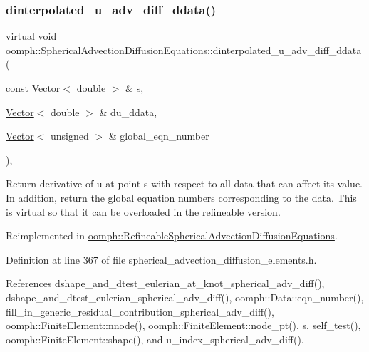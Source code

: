 \subsubsection{\texorpdfstring{dinterpolated\+\_\+u\+\_\+adv\+\_\+diff\+\_\+ddata()}{dinterpolated\_u\_adv\_diff\_ddata()}}
{\footnotesize\ttfamily virtual void oomph\+::\+Spherical\+Advection\+Diffusion\+Equations\+::dinterpolated\+\_\+u\+\_\+adv\+\_\+diff\+\_\+ddata (\begin{DoxyParamCaption}\item[{const \hyperlink{classoomph_1_1Vector}{Vector}$<$ double $>$ \&}]{s,  }\item[{\hyperlink{classoomph_1_1Vector}{Vector}$<$ double $>$ \&}]{du\+\_\+ddata,  }\item[{\hyperlink{classoomph_1_1Vector}{Vector}$<$ unsigned $>$ \&}]{global\+\_\+eqn\+\_\+number }\end{DoxyParamCaption})\hspace{0.3cm}{\ttfamily [inline]}, {\ttfamily [virtual]}}



Return derivative of u at point s with respect to all data that can affect its value. In addition, return the global equation numbers corresponding to the data. This is virtual so that it can be overloaded in the refineable version. 



Reimplemented in \hyperlink{classoomph_1_1RefineableSphericalAdvectionDiffusionEquations_ad334452c86e729a53dcbd234a1420680}{oomph\+::\+Refineable\+Spherical\+Advection\+Diffusion\+Equations}.



Definition at line 367 of file spherical\+\_\+advection\+\_\+diffusion\+\_\+elements.\+h.



References dshape\+\_\+and\+\_\+dtest\+\_\+eulerian\+\_\+at\+\_\+knot\+\_\+spherical\+\_\+adv\+\_\+diff(), dshape\+\_\+and\+\_\+dtest\+\_\+eulerian\+\_\+spherical\+\_\+adv\+\_\+diff(), oomph\+::\+Data\+::eqn\+\_\+number(), fill\+\_\+in\+\_\+generic\+\_\+residual\+\_\+contribution\+\_\+spherical\+\_\+adv\+\_\+diff(), oomph\+::\+Finite\+Element\+::nnode(), oomph\+::\+Finite\+Element\+::node\+\_\+pt(), s, self\+\_\+test(), oomph\+::\+Finite\+Element\+::shape(), and u\+\_\+index\+\_\+spherical\+\_\+adv\+\_\+diff().

\mbox{\label{classoomph_1_1SphericalAdvectionDiffusionEquations_a097613909cb9b016e55190df3c7b3d2f}} 
